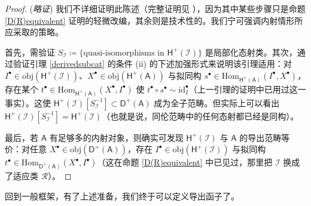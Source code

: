 \begin{proof}(\textit{略证})
	我们不详细证明此陈述（完整证明见 \cite[subsections III.5.22--25]{[GM03]}），因为其中某些步骤只是命题 \ref{D(R)equivalent} 证明的轻微改编，其余则是技术性的。我们宁可强调内射情形所应采取的策略。
	
	首先，需验证 $S_\mathcal{I}\coloneqq\{\text{quasi-isomorphisms in }\mathsf{H^+(\mathcal{I})}\}$ 是局部化态射类。其次，通过验证引理 \ref{derivedsubcat} 的条件 (ii) 的下述加强形式来说明该引理适用：对 $I^\bullet\in\text{obj}(\mathsf{H^+(\mathcal{I})})$、$X^\bullet\in\text{obj}(\mathsf{H^+(A)})$ 与拟同构 $s^\bullet\in\text{Hom}_\mathsf{H^+(A)}(I^\bullet, X^\bullet)$，存在某个 $t^\bullet\in\text{Hom}_\mathsf{H^+(A)}(X^\bullet, I^\bullet)$ 使 $t^\bullet\circ s^\bullet\sim\text{id}_I^\bullet$（上一引理的证明中已用过这一事实）。这使 $\mathsf{H^+(\mathcal{I})}[S_\mathcal{I}^{-1}]\subset\mathsf{D^+(A)}$ 成为全子范畴。但实际上可以看出 $\mathsf{H^+(\mathcal{I})}[S_\mathcal{I}^{-1}]=\mathsf{H^+}(\mathcal{I})$（也就是说，同伦范畴中的任何态射都已经是同构）。
	
	最后，若 $\mathsf{A}$ 有足够多的内射对象，则确实可发现 $\mathsf{H^+(\mathcal{I})}$ 与 $\mathsf{A}$ 的导出范畴等价：对任意 $X^\bullet\in\text{obj}(\mathsf{D^+(A)})$，存在 $I^\bullet\in\text{obj}(\mathsf{H^+(\mathcal{I})})$ 与拟同构 $t^\bullet\in\text{Hom}_\mathsf{D^+(A)}(X^\bullet, I^\bullet)$（这在命题 \ref{D(R)equivalent} 中已见过，那里把 $\mathcal{I}$ 换成了适应类 $\mathcal{R}$）。
\end{proof}

回到一般框架，有了上述准备，我们终于可以定义导出函子了。

